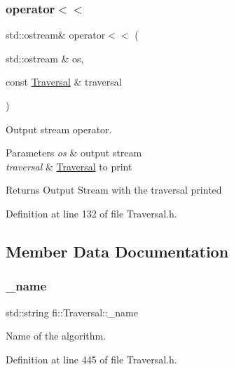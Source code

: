 \subsubsection{\texorpdfstring{operator$<$$<$}{operator<<}}
{\footnotesize\ttfamily std\+::ostream\& operator$<$$<$ (\begin{DoxyParamCaption}\item[{std\+::ostream \&}]{os,  }\item[{const \hyperlink{classfi_1_1Traversal}{Traversal} \&}]{traversal }\end{DoxyParamCaption})\hspace{0.3cm}{\ttfamily [friend]}}



Output stream operator. 


\begin{DoxyParams}{Parameters}
{\em os} & output stream \\
\hline
{\em traversal} & \hyperlink{classfi_1_1Traversal}{Traversal} to print \\
\hline
\end{DoxyParams}
\begin{DoxyReturn}{Returns}
Output Stream with the traversal printed 
\end{DoxyReturn}


Definition at line 132 of file Traversal.\+h.



\subsection{Member Data Documentation}
\mbox{\label{classfi_1_1Traversal_ab23be4e2267a72da9c7e8f51c1dea79a}} 
\subsubsection{\texorpdfstring{\+\_\+name}{\_name}}
{\footnotesize\ttfamily std\+::string fi\+::\+Traversal\+::\+\_\+name\hspace{0.3cm}{\ttfamily [private]}}



Name of the algorithm. 



Definition at line 445 of file Traversal.\+h.

\mbox{\label{classfi_1_1Traversal_a18d5f35cd062bda819c265ab6b1c681f}} 
